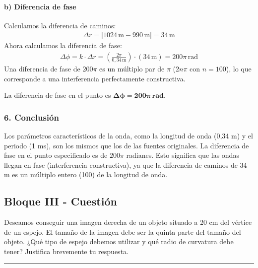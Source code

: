 \paragraph*{b) Diferencia de fase}
Calculamos la diferencia de caminos:
\begin{gather}
    \Delta r = |1024 \, \text{m} - 990 \, \text{m}| = 34 \, \text{m}
\end{gather}
Ahora calculamos la diferencia de fase:
\begin{gather}
    \Delta\phi = k \cdot \Delta r = \left(\frac{2\pi}{0,34 \, \text{m}}\right) \cdot (34 \, \text{m}) = 200\pi \, \text{rad}
\end{gather}
Una diferencia de fase de $200\pi$ es un múltiplo par de $\pi$ ($2n\pi$ con $n=100$), lo que corresponde a una interferencia perfectamente constructiva.
\begin{cajaresultado}
    La diferencia de fase en el punto es $\boldsymbol{\Delta\phi = 200\pi \, \textbf{rad}}$.
\end{cajaresultado}

\subsubsection*{6. Conclusión}
\begin{cajaconclusion}
Los parámetros característicos de la onda, como la longitud de onda (0,34 m) y el periodo (1 ms), son los mismos que los de las fuentes originales. La diferencia de fase en el punto especificado es de $200\pi$ radianes. Esto significa que las ondas llegan en fase (interferencia constructiva), ya que la diferencia de caminos de 34 m es un múltiplo entero (100) de la longitud de onda.
\end{cajaconclusion}

\newpage

\subsection{Bloque III - Cuestión}
\label{subsec:A3_2010_sep_ext}

\begin{cajaenunciado}
Deseamos conseguir una imagen derecha de un objeto situado a 20 cm del vértice de un espejo. El tamaño de la imagen debe ser la quinta parte del tamaño del objeto. ¿Qué tipo de espejo debemos utilizar y qué radio de curvatura debe tener? Justifica brevemente tu respuesta.
\end{cajaenunciado}
\hrule

